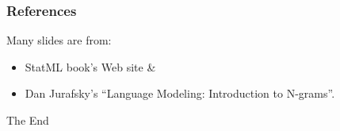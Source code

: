 \documentclass{beamer}
\begin{document}





\begin{frame} \frametitle{References}
Many slides are from:
\begin{itemize}
\item StatML book's Web site \&
\item Dan Jurafsky's
``Language Modeling: Introduction to N-grams''. 
\end{itemize}

\end{frame}

\begin{frame}
\Huge{\centerline{The End}}
\end{frame}

\end{document}
